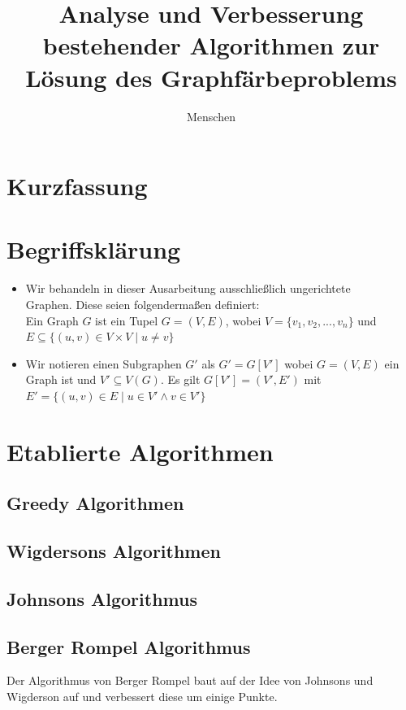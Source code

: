 \documentclass[11pt]{article}
\title{Analyse und Verbesserung bestehender Algorithmen zur Lösung des Graphfärbeproblems}
\author{Menschen} %
\begin{document}
\maketitle

\tableofcontents
\newpage

\section{Kurzfassung} %
\section{Begriffsklärung} %
\begin{itemize}[noitemsep, left=0pt]
\item Wir behandeln in dieser Ausarbeitung ausschließlich ungerichtete \\Graphen.
Diese seien folgendermaßen definiert:\\
Ein Graph $G$ ist ein Tupel $G=(V,E)$, wobei $V=\{v_1,v_2,...,v_n\}$ und $E\subseteq \{(u,v)\in V\times V \mid u\neq v\}$
\item Wir notieren einen Subgraphen $G'$ als $G'=G[V']$ wobei $G=(V,E)$ ein Graph ist und $V'\subseteq V(G)$. Es gilt $G[V']=(V',E')$ mit $E'=\{(u,v)\in E\mid u\in V'\land v\in V'\}$
\end{itemize}
\section{Etablierte Algorithmen}
\subsection{Greedy Algorithmen} %
\subsection{Wigdersons Algorithmen} %
\subsection{Johnsons Algorithmus} %
\subsection{Berger Rompel Algorithmus} %

Der Algorithmus von Berger Rompel
baut auf der Idee von Johnsons und Wigderson auf
und verbessert diese um einige Punkte.
\cite{berger_rompel}
\end{document}
